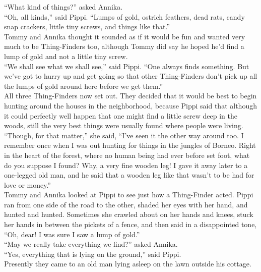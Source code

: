 \documentclass{standard}
\begin{document}
``What kind of things?” asked Annika.\\

``Oh, all kinds,” said Pippi. ``Lumps of gold, ostrich feathers, dead rats, candy snap crackers, little tiny screws, and things like that.”\\

Tommy and Annika thought it sounded as if it would be fun and wanted very much to be Thing-Finders too, although Tommy did say he hoped he’d find a lump of gold and not a little tiny screw.\\

``We shall see what we shall see,” said Pippi. ``One always finds something. But we’ve got to hurry up and get going so that other Thing-Finders don’t pick up all the lumps of gold around here before we get them.”\\

All three Thing-Finders now set out. They decided that it would be best to begin hunting around the houses in the neighborhood, because Pippi said that although it could perfectly well happen that one might find a little screw deep in the woods, still the very best things were usually found where people were living.\\

``Though, for that matter,” she said, ``I’ve seen it the other way around too. I remember once when I was out hunting for things in the jungles of Borneo. Right in the heart of the forest, where no human being had ever before set foot, what do you suppose I found? Why, a very fine wooden leg! I gave it away later to a one-legged old man, and he said that a wooden leg like that wasn’t to be had for love or money.”\\

Tommy and Annika looked at Pippi to see just how a Thing-Finder acted. Pippi ran from one side of the road to the other, shaded her eyes with her hand, and hunted and hunted. Sometimes she crawled about on her hands and knees, stuck her hands in between the pickets of a fence, and then said in a disappointed tone, ``Oh, dear! I was sure I saw a lump of gold.”\\

``May we really take everything we find?” asked Annika.\\

``Yes, everything that is lying on the ground,” said Pippi.\\

Presently they came to an old man lying asleep on the lawn outside his cottage.\\
\end{document}
